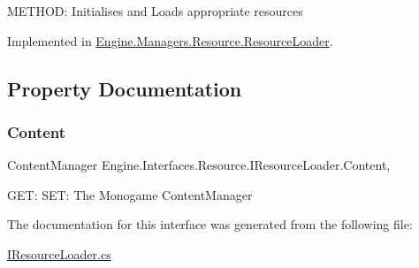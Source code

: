 M\+E\+T\+H\+OD\+: Initialises and Loads appropriate resources 



Implemented in \hyperlink{a00530_a77b00bda1dc37c9cabe2dbaf90655714}{Engine.\+Managers.\+Resource.\+Resource\+Loader}.



\subsection{Property Documentation}
\mbox{\label{a00462_a03b81447dfab7f3391b8f265dfd231c8}} 
\subsubsection{\texorpdfstring{Content}{Content}}
{\footnotesize\ttfamily Content\+Manager Engine.\+Interfaces.\+Resource.\+I\+Resource\+Loader.\+Content\hspace{0.3cm}{\ttfamily [get]}, {\ttfamily [set]}}



G\+ET\+: S\+ET\+: The Monogame Content\+Manager 



The documentation for this interface was generated from the following file\+:\begin{DoxyCompactItemize}
\item 
\hyperlink{a00128}{I\+Resource\+Loader.\+cs}\end{DoxyCompactItemize}
